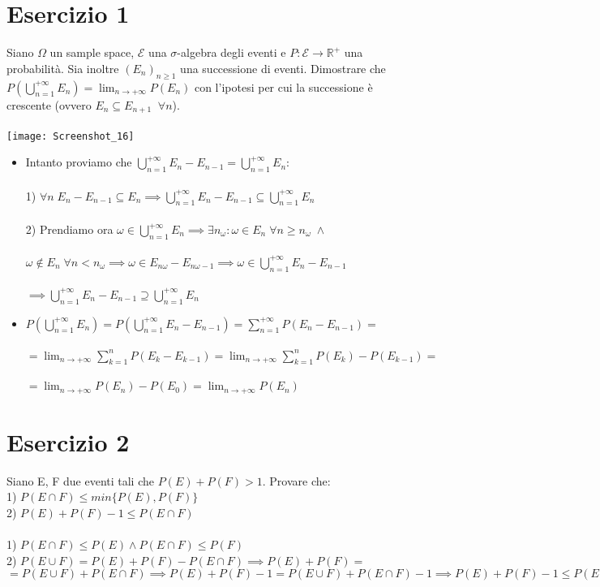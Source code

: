 \documentclass{article}
\begin{document}
\section*{Esercizio 1}
Siano $\Omega$ un sample space, $\mathcal{E}$ una $\sigma$-algebra degli eventi e $P: \mathcal{E} \to \mathbb{R}^+$ una probabilità. Sia inoltre $(E_{n})_{n\geq 1}$ una successione di eventi. Dimostrare che $P(\bigcup_{n=1}^{+\infty}E_{n}) = \lim_{n\to +\infty}P(E_{n})$ con l'ipotesi per cui la successione è crescente (ovvero $E_{n} \subseteq E_{n+1} \; \; \forall n$).\\
\\
\texttt{[image: Screenshot\_16]}
\begin{itemize}
\item Intanto proviamo che $\bigcup_{n=1}^{+\infty}E_{n}-E_{n-1} = \bigcup_{n=1}^{+\infty}E_{n}$:\\ \\
1) $\forall n \; E_{n}-E_{n-1} \subseteq E_{n} \implies \bigcup_{n=1}^{+\infty}E_{n}-E_{n-1} \subseteq \bigcup_{n=1}^{+\infty}E_{n}$\\ \\
2) Prendiamo ora $\omega \in \bigcup_{n=1}^{+\infty}E_{n} \implies \exists n_{\omega} : \omega \in E_{n} \; \forall n \geq n_{\omega} \; \wedge$\\ \\
$\omega \notin E_{n} \; \forall n<n_{\omega} \implies \omega \in E_{n\omega}-E_{n\omega-1} \implies \omega \in \bigcup_{n=1}^{+\infty}E_{n}-E_{n-1}$\\ \\
$\implies \bigcup_{n=1}^{+\infty}E_{n}-E_{n-1} \supseteq \bigcup_{n=1}^{+\infty}E_{n}$\\
\item $P(\bigcup_{n=1}^{+\infty}E_{n}) = P(\bigcup_{n=1}^{+\infty}E_{n}-E_{n-1}) = \sum_{n=1}^{+\infty}P(E_{n}-E_{n-1}) =$\\ \\
$=\lim_{n\to +\infty}\sum_{k=1}^{n}P(E_{k}-E_{k-1}) = \lim_{n\to +\infty}\sum_{k=1}^{n}P(E_{k})-P(E_{k-1}) =$\\ \\
$= \lim_{n\to +\infty}P(E_{n})-P(E_{0}) = \lim_{n\to +\infty}P(E_{n})$
\end{itemize}

\section*{Esercizio 2}
Siano E, F due eventi tali che $P(E)+P(F)>1$. Provare che:\\
1) $P(E \cap F) \leq min\{P(E), P(F)\}$\\
2) $P(E)+P(F)-1 \leq P(E \cap F)$\\
\\
1) $P(E \cap F) \leq P(E) \wedge P(E \cap F) \leq P(F)$\\
2) $P(E \cup F) = P(E)+P(F)-P(E \cap F) \implies P(E)+P(F) =$\\
$= P(E \cup F)+P(E \cap F) \implies P(E)+P(F)-1 = P(E \cup F)+P(E \cap F)-1 \implies P(E)+P(F)-1 \leq P(E \cap F)$
\end{document}

